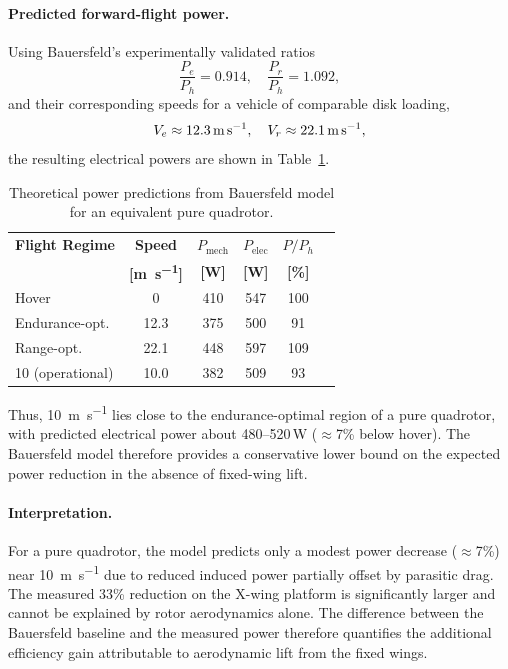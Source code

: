 \paragraph{Predicted forward-flight power.}
Using Bauersfeld's experimentally validated ratios
\begin{equation}
\frac{P_e}{P_h} = 0.914, \quad \frac{P_r}{P_h} = 1.092,
\end{equation}
and their corresponding speeds for a vehicle of comparable disk loading,
\begin{equation}
V_e \approx 12.3\,\text{m\,s}^{-1}, \quad V_r \approx 22.1\,\text{m\,s}^{-1},
\end{equation}
the resulting electrical powers are shown in Table~\ref{tab:power_model_comparison}.

\begin{table}[htbp]
\centering
\caption{Theoretical power predictions from Bauersfeld model for an equivalent pure quadrotor.}
\label{tab:power_model_comparison}
\begin{tabular}{lccccc}
\hline
\textbf{Flight Regime} & \textbf{Speed} & \textbf{$P_{\text{mech}}$} & \textbf{$P_{\text{elec}}$} & \textbf{$P/P_h$} \\
& \textbf{[\si{\meter\per\second}]} & \textbf{[\si{\watt}]} & \textbf{[\si{\watt}]} & \textbf{[\%]} \\
\hline
Hover & 0 & 410 & 547 & 100 \\
Endurance-opt. & 12.3 & 375 & 500 & 91 \\
Range-opt. & 22.1 & 448 & 597 & 109 \\
10 (operational) & 10.0 & 382 & 509 & 93 \\
\hline
\end{tabular}
\end{table}

Thus, \SI{10}{\meter\per\second} lies close to the endurance-optimal region of a pure quadrotor, with predicted electrical power about 480--520\,W ($\approx$7\% below hover).
The Bauersfeld model therefore provides a conservative lower bound on the expected power reduction in the absence of fixed-wing lift.

\paragraph{Interpretation.}
For a pure quadrotor, the model predicts only a modest power decrease ($\approx$7\%) near \SI{10}{\meter\per\second} due to reduced induced power partially offset by parasitic drag.
The measured 33\% reduction on the X-wing platform is significantly larger and cannot be explained by rotor aerodynamics alone.
The difference between the Bauersfeld baseline and the measured power therefore quantifies the additional efficiency gain attributable to aerodynamic lift from the fixed wings.

